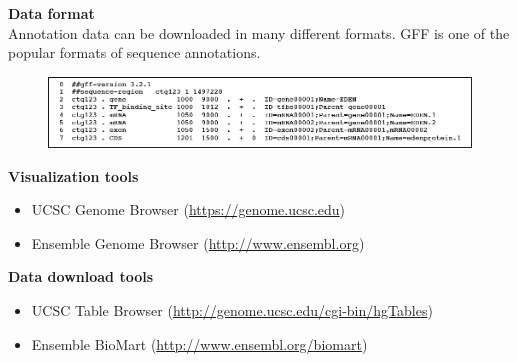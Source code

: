 \noindent
\textbf{Data format} \\
Annotation data can be downloaded in many different formats. GFF is one of the popular formats of sequence annotations.
\begin{figure}[H]
  \centering
      \includegraphics[width=\textwidth]{fig05/gff3.png}
\end{figure}

\noindent
\textbf{Visualization tools}
\begin{itemize}
\item UCSC Genome Browser (\href{https://genome.ucsc.edu}{https://genome.ucsc.edu})
\item Ensemble Genome Browser (\href{http://www.ensembl.org}{http://www.ensembl.org})
\end{itemize}

\noindent
\textbf{Data download tools}
\begin{itemize}
\item UCSC Table Browser (\href{http://genome.ucsc.edu/cgi-bin/hgTables}{http://genome.ucsc.edu/cgi-bin/hgTables})
\item Ensemble BioMart (\href{http://www.ensembl.org/biomart}{http://www.ensembl.org/biomart})
\end{itemize}

\bigskip 

%

